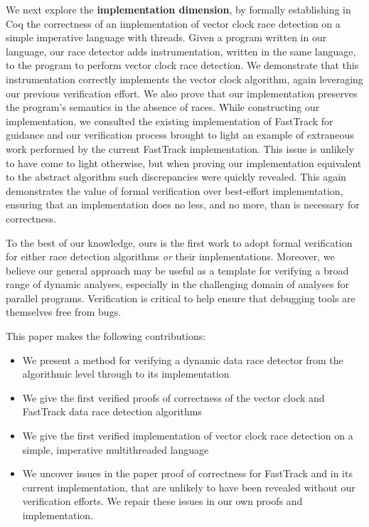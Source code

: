 \documentclass[preprint, 10pt]{sigplanconf}
\begin{document}
We next explore the \textbf{implementation dimension}, by formally establishing in Coq the correctness of an implementation of vector clock race detection on a simple imperative language with threads. Given a program written in our language, our race detector adds instrumentation, written in the same language, to the program to perform vector clock race detection. We demonstrate that this instrumentation correctly implements the vector clock algorithm, again leveraging our previous verification effort. We also prove that our implementation preserves the program's semantics in the absence of races. While constructing our implementation, we consulted the existing implementation of FastTrack for guidance and our verification process brought to light an example of extraneous work performed by the current FastTrack implementation. This issue is unlikely to have come to light otherwise, but when proving our implementation equivalent to the abstract algorithm such discrepancies were quickly revealed. This again demonstrates the value of formal verification over best-effort implementation, ensuring that an implementation does no less, and no more, than is necessary for correctness.

To the best of our knowledge, ours is the first work to adopt formal verification for either race detection algorithms \emph{or} their implementations. Moreover, we believe our general approach may be useful as a template for verifying a broad range of dynamic analyses, especially in the challenging domain of analyses for parallel programs. Verification is critical to help ensure that debugging tools are themselves free from bugs.

This paper makes the following contributions:
\begin{itemize}
\item We present a method for verifying a dynamic data race detector from the algorithmic level through to its implementation
\item We give the first verified proofs of correctness of the vector clock and FastTrack data race detection algorithms
\item We give the first verified implementation of vector clock race detection on a simple, imperative multithreaded language
\item We uncover issues in the paper proof of correctness for FastTrack and in its current implementation, that are unlikely to have been revealed without our verification efforts. We repair these issues in our own proofs and implementation.
\end{itemize}
\end{document}
